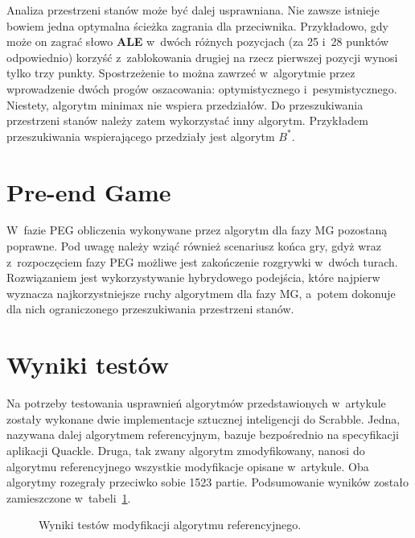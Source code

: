 \documentclass[a4paper,twocolumn,11pt]{article}
\theoremstyle{definition}
\begin{document}
Analiza przestrzeni stanów może być dalej usprawniana. Nie zawsze istnieje bowiem jedna optymalna ścieżka zagrania dla przeciwnika. Przykładowo, gdy może on zagrać słowo \textbf{ALE} w~dwóch różnych pozycjach (za 25 i~28 punktów odpowiednio) korzyść z~zablokowania drugiej na rzecz pierwszej pozycji wynosi tylko trzy punkty. Spostrzeżenie to można zawrzeć w~algorytmie przez wprowadzenie dwóch progów oszacowania: optymistycznego i~pesymistycznego. Niestety, algorytm minimax nie wspiera przedziałów. Do przeszukiwania przestrzeni stanów należy zatem wykorzystać inny algorytm. Przykładem przeszukiwania wspierającego przedziały jest algorytm $B^{*}$. \cite{bstar}

\section{Pre-end Game}

W~fazie PEG obliczenia wykonywane przez algorytm dla fazy MG pozostaną poprawne. Pod uwagę należy wziąć również scenariusz końca gry, gdyż wraz z~rozpoczęciem fazy PEG możliwe jest zakończenie rozgrywki w~dwóch turach. Rozwiązaniem jest wykorzystywanie hybrydowego podejścia, które najpierw wyznacza najkorzystniejsze ruchy algorytmem dla fazy MG, a~potem dokonuje dla nich ograniczonego przeszukiwania przestrzeni stanów.

\section{Wyniki testów}

Na potrzeby testowania usprawnień algorytmów przedstawionych w~artykule zostały wykonane dwie implementacje sztucznej inteligencji do Scrabble. Jedna, nazywana dalej algorytmem referencyjnym, bazuje bezpośrednio na specyfikacji aplikacji Quackle. \cite{quackle_algorithm} Druga, tak zwany algorytm zmodyfikowany, nanosi do algorytmu referencyjnego wszystkie modyfikacje opisane w~artykule. Oba algorytmy rozegrały przeciwko sobie 1523 partie. Podsumowanie wyników zostało zamieszczone w~tabeli~\ref{tab:test_results}.

\begin{figure}[ht!]
	\centering
	\caption{Wyniki testów modyfikacji algorytmu referencyjnego.}
	\label{tab:test_results}
\end{figure}
\end{document}
